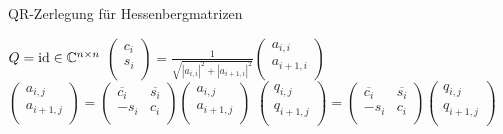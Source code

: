 \documentclass{article}
\begin{document}
\begin{algorithm}
	\label{QR-Zerlegung_Hessenberg}
	\caption{QR-Zerlegung für Hessenbergmatrizen}
	\begin{algorithmic}[1]
		\State $Q = \operatorname{id} \in \mathbb{C}^{n\times n}$
		\State $\left(\begin{array}{c}
    c_i \\
    s_i \\
\end{array}\right)
=
\frac{1}{\sqrt{|a_{i,i}|^2 + |a_{i+1,i}|^2}}
\left(\begin{array}{c}
a_{i,i} \\
a_{i+1,i} \\
\end{array}\right)$
		\State $\left(\begin{array}{c}
		a_{i,j} \\
		a_{i+1,j}\\
		\end{array}\right)
		=
		\left(\begin{array}{cc}
		\overline{c_i} & \overline{s_i} \\
		-s_i & c_i \\
		\end{array}
		\right)
		\left(\begin{array}{c}
		a_{i,j} \\
		a_{i+1,j}\\
		\end{array}\right)$
		\EndFor
		\State $\left(\begin{array}{c}
		q_{i,j} \\
		q_{i+1,j}\\
		\end{array}\right)
		=
		\left(\begin{array}{cc}
		\overline{c_i} & \overline{s_i} \\
		-s_i & c_i \\
		\end{array}
		\right)
		\left(\begin{array}{c}
		q_{i,j} \\
		q_{i+1,j}\\
		\end{array}\right)$
		\EndFor
		\EndFor
	\end{algorithmic}
\end{algorithm}
\end{document}
